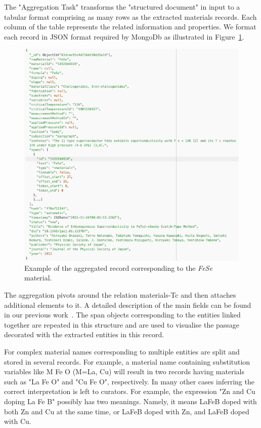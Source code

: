 \documentclass[a4paper]{article}
\begin{document}
The "Aggregation Task" transforms the "structured document" in input to a tabular format comprising as many rows as the extracted materials records. 
Each column of the table represents the related information and properties. 
We format each record in JSON format required by MongoDb as illustrated in Figure~\ref{fig:data-flow-3}.

\begin{figure}[ht]
  \centering\small
  \includegraphics[width=1\textwidth]{images/data-flow-3} 
  \caption{Example of the aggregated record corresponding to the \textit{FeSe} material.}
  \label{fig:data-flow-3}
\end{figure}

The aggregation pivots around the relation materials-Tc and then attaches additional elements to it. 
A detailed description of the main fields can be found in our previous work~\cite{lfoppiano2023automatic}. The span objects corresponding to the entities linked together are repeated in this structure and are used to visualise the passage decorated with the extracted entities in this record.

For complex material names corresponding to multiple entities are split and stored in several records.
For example, a material name containing substitution variables like M Fe O (M=La, Cu) will result in two records having materials such as "La Fe O" and "Cu Fe O", respectively. 
In many other cases inferring the correct interpretation is left to curators. 
For example, the expression "Zn and Cu doping La Fe B" possibly has two meanings. Namely, it means LaFeB doped with both Zn and Cu at the same time, or LaFeB doped with Zn, and LaFeB doped with Cu. 
\end{document}
